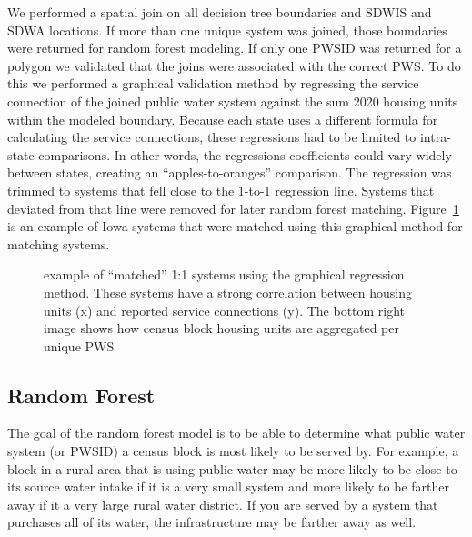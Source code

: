 \documentclass[
  letterpaper,
  DIV=11,
  numbers=noendperiod,
  oneside]{scrartcl}
\begin{document}
We performed a spatial join on all decision tree boundaries and SDWIS
and SDWA locations. If more than one unique system was joined, those
boundaries were returned for random forest modeling. If only one PWSID
was returned for a polygon we validated that the joins were associated
with the correct PWS. To do this we performed a graphical validation
method by regressing the service connection of the joined public water
system against the sum 2020 housing units within the modeled boundary.
Because each state uses a different formula for calculating the service
connections, these regressions had to be limited to intra-state
comparisons. In other words, the regressions coefficients could vary
widely between states, creating an ``apples-to-oranges'' comparison. The
regression was trimmed to systems that fell close to the 1-to-1
regression line. Systems that deviated from that line were removed for
later random forest matching. Figure~\ref{fig-IA} is an example of Iowa
systems that were matched using this graphical method for matching
systems.

\begin{figure}


\caption{\label{fig-IA}example of ``matched'' 1:1 systems using the
graphical regression method. These systems have a strong correlation
between housing units (x) and reported service connections (y). The
bottom right image shows how census block housing units are aggregated
per unique PWS}

\end{figure}%

\subsection{Random Forest}\label{random-forest}

The goal of the random forest model is to be able to determine what
public water system (or PWSID) a census block is most likely to be
served by. For example, a block in a rural area that is using public
water may be more likely to be close to its source water intake if it is
a very small system and more likely to be farther away if it a very
large rural water district. If you are served by a system that purchases
all of its water, the infrastructure may be farther away as well.
\end{document}
